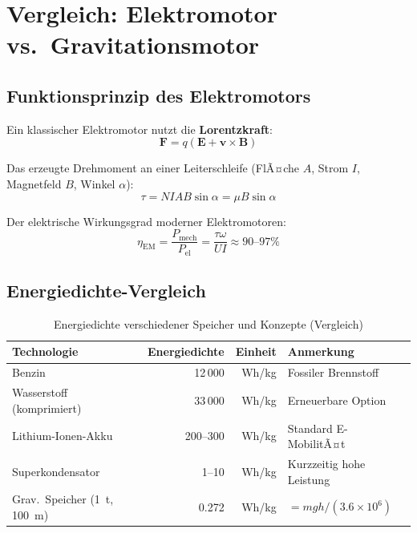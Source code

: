 ﻿\documentclass[12pt, a4paper]{report}
\theoremstyle{definition}
\theoremstyle{remark}
\newcommand{\vek}[1]{\boldsymbol{#1}}
\begin{document}
\chapter{Vergleich: Elektromotor vs.\ Gravitationsmotor}
\label{sec:vergleich}

\section{Funktionsprinzip des Elektromotors}

Ein klassischer Elektromotor nutzt die \textbf{Lorentzkraft}:
\begin{equation}
  \vek{F} = q(\vek{E} + \vek{v} \times \vek{B})
  \label{eq:lorentz}
\end{equation}

Das erzeugte Drehmoment an einer Leiterschleife (FlÃ¤che $A$, Strom $I$,
Magnetfeld $B$, Winkel $\alpha$):
\begin{equation}
  \tau = N I A B \sin\alpha = \mu B \sin\alpha
  \label{eq:em_drehmoment}
\end{equation}

Der elektrische Wirkungsgrad moderner Elektromotoren:
\begin{equation}
  \eta_{\text{EM}} = \frac{P_{\text{mech}}}{P_{\text{el}}} = \frac{\tau \omega}{U I} \approx 90\text{--}97\%
  \label{eq:em_wirk}
\end{equation}

\section{Energiedichte-Vergleich}

\begin{table}[H]
  \centering
  \caption{Energiedichte verschiedener Speicher und Konzepte (Vergleich)}
  \label{tab:energiedichte}
  \begin{tabular}{lrrl}
    \toprule
    \textbf{Technologie} & \textbf{Energiedichte} & \textbf{Einheit} & \textbf{Anmerkung} \\
    \midrule
    Benzin               & 12\,000          & Wh/kg   & Fossiler Brennstoff \\
    Wasserstoff (komprimiert) & 33\,000   & Wh/kg   & Erneuerbare Option \\
    Lithium-Ionen-Akku   & 200--300         & Wh/kg   & Standard E-MobilitÃ¤t \\
    Superkondensator      & 1--10            & Wh/kg   & Kurzzeitig hohe Leistung \\
    Grav.\ Speicher (\SI{1}{\tonne}, \SI{100}{\metre}) & 0.272 & Wh/kg & $=mgh/(3.6\times10^6)$ \\
    \bottomrule
  \end{tabular}
\end{table}
\end{document}
